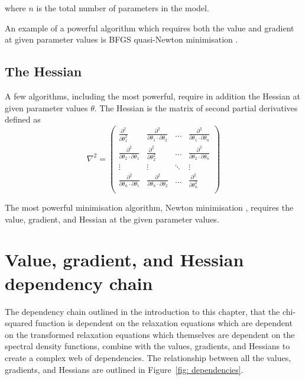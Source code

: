\noindent where $n$ is the total number of parameters in the model.

An example of a powerful algorithm which requires both the value and gradient at given parameter values is BFGS quasi-Newton minimisation .


\subsection{The Hessian}

A few algorithms, including the most powerful, require in addition the Hessian at given parameter values $\theta$.  The Hessian is the matrix of second partial derivatives defined as
\begin{equation}
 \nabla^2 = \begin{pmatrix}
  \frac{\partial^2}{\partial \theta_1^2}                       & \frac{\partial^2}{\partial \theta_1 \cdot \partial \theta_2}  & \ldots    & \frac{\partial^2}{\partial \theta_1 \cdot \partial \theta_n} \\
  \frac{\partial^2}{\partial \theta_2 \cdot \partial \theta_1} & \frac{\partial^2}{\partial \theta_2^2}                        & \ldots    & \frac{\partial^2}{\partial \theta_2 \cdot \partial \theta_n} \\
  \vdots                                                       & \vdots                                                        & \ddots    & \vdots \\
  \frac{\partial^2}{\partial \theta_n \cdot \partial \theta_1} & \frac{\partial^2}{\partial \theta_n \cdot \partial \theta_2}  & \ldots    & \frac{\partial^2}{\partial \theta_n^2} \\
 \end{pmatrix}
\end{equation}

The most powerful minimisation algorithm, Newton minimisation , requires the value, gradient, and Hessian at the given parameter values.




\section{Value, gradient, and Hessian dependency chain}

The dependency chain outlined in the introduction to this chapter, that the chi-squared function is dependent on the relaxation equations which are dependent on the transformed relaxation equations which themselves are dependent on the spectral density functions, combine with the values, gradients, and Hessians to create a complex web of dependencies.  The relationship between all the values, gradients, and Hessians are outlined in Figure~\ref{fig: dependencies}.

